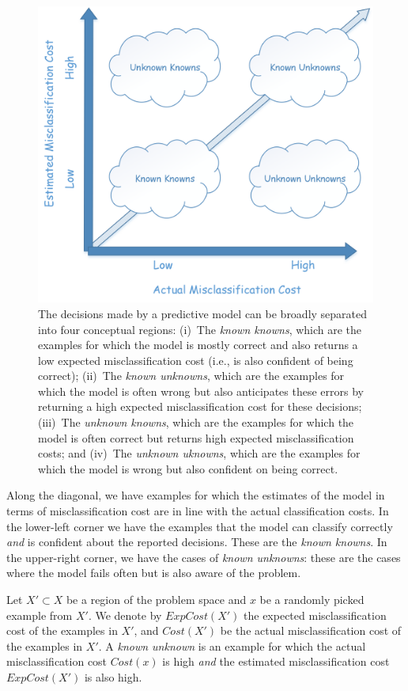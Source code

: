 \begin{figure}[t]
\centering
\includegraphics[width=0.5\columnwidth]{plots/Quadrant.png}
\caption{The decisions made by a predictive model can be broadly separated into four conceptual regions: (i)~The \emph{known knowns}, which are the examples for which the model is mostly correct and also returns a low expected misclassification cost (i.e., is also confident of being correct); (ii)~The \emph{known unknowns}, which are the examples for which the model is often wrong but also anticipates these errors by returning a high expected misclassification cost for these decisions; (iii)~The \emph{unknown knowns}, which are the examples for which the model is often correct but returns high expected misclassification costs; and (iv)~The \emph{unknown uknowns}, which are the examples for which the model is wrong but also confident on being correct.}
\label{fig:quadrant}
\end{figure}

Along the diagonal, we have examples for which the estimates of the model in terms of misclassification cost are in line with the actual classification costs. In the lower-left corner we have the examples that the model can classify correctly \emph{and} is confident about the reported decisions. These are the \emph{known knowns}. In the upper-right corner, we have the cases of \emph{known unknowns}: these are the cases where the model fails often but is also aware of the problem.

\begin{definition}
\label{def:ku}
Let $X' \subset X$ be a region of the problem space and $x$ be a randomly picked example from $X'$. 
We denote by $\mathit{ExpCost}(X')$ the expected misclassification cost of the examples in $X'$, and $\mathit{Cost}(X')$ be the actual misclassification cost of the examples in $X'$. A \emph{known unknown} is an example for which the actual misclassification cost $\mathit{Cost}(x)$ is high \emph{and} the estimated misclassification cost $\mathit{ExpCost}(X')$ is also high.\smartqed
\end{definition}

